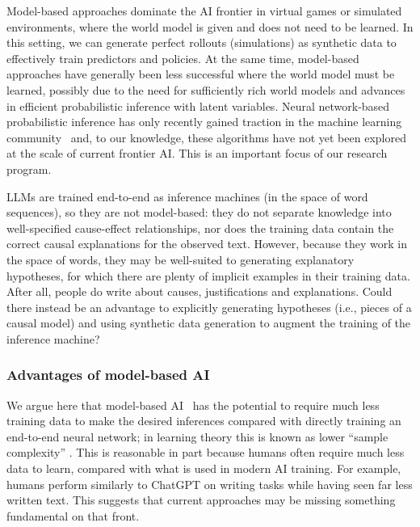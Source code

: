 Model-based approaches dominate the AI frontier in virtual games or simulated environments, where the world model is given and does not need to be learned. In this setting, we can generate perfect rollouts (simulations) as synthetic data to effectively train predictors and policies. At the same time, model-based approaches have generally been less successful where the world model must be learned, possibly due to the need for sufficiently rich world models and advances in efficient probabilistic inference with latent variables. Neural network-based probabilistic inference has only recently gained traction in the machine learning community~\cite{probml.github.io.pml.book.book1.html,proceedings.neurips.cc.paper.2020.hash.4c5bcfec8584af0d967f1ab10179ca4b.Abstract.html,proceedings.mlr.press.v162.zhang22v.html} and, to our knowledge, these algorithms have not yet been explored at the scale of current frontier AI. This is an important focus of our research program.

LLMs are trained end-to-end as inference machines (in the space of word sequences), so they are not model-based: they do not separate knowledge into well-specified cause-effect relationships, nor does the training data contain the correct causal explanations for the observed text. However, because they work in the space of words, they may be well-suited to generating explanatory hypotheses, for which there are plenty of implicit examples in their training data. After all, people do write about causes, justifications and explanations. Could there instead be an advantage to explicitly generating hypotheses (i.e., pieces of a causal model) and using synthetic data generation to augment the training of the inference machine?

\subsubsection{Advantages of model-based AI}
    
We argue here that model-based AI~\cite{bishop2013model} has the potential to require much less training data to make the desired inferences compared with directly training an end-to-end neural network; in learning theory this is known as lower ``sample complexity'' \cite{homes.cs.washington.edu..sham.papers.thesis.sham.thesis.pdf}. This is reasonable in part because humans often require much less data to learn, compared with what is used in modern AI training. For example, humans perform similarly to ChatGPT on writing tasks while having seen far less written text. This suggests that current approaches may be missing something fundamental on that front.

